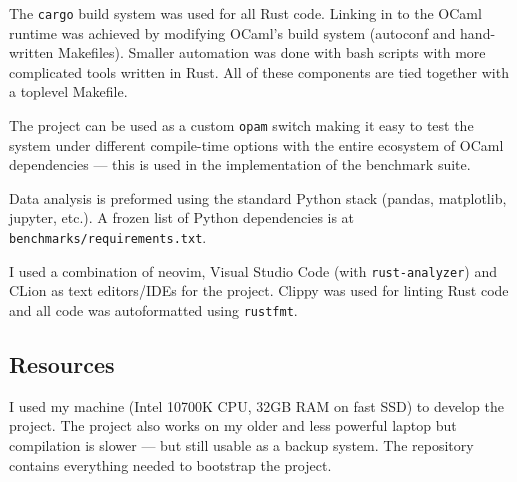 
The \texttt{cargo} build system was used for all Rust code. Linking in to the OCaml runtime was
achieved by modifying OCaml's build system (autoconf and hand-written Makefiles). Smaller
automation
was done with bash scripts with more complicated tools written in Rust.  All of these components
are tied together with a toplevel Makefile.

The project can be used as a custom \texttt{opam} switch making it easy to test the system under
different compile-time options with the entire ecosystem of OCaml dependencies --- this is used in
the implementation of the benchmark suite.

Data analysis is preformed using the standard Python stack (pandas, matplotlib, jupyter, etc.). A
frozen
list of Python dependencies is at \texttt{benchmarks/requirements.txt}.

I used a combination of neovim, Visual Studio Code (with \texttt{rust-analyzer}) and CLion as text
editors/IDEs for the project.  Clippy was used for linting Rust code and all code was autoformatted
using \texttt{rustfmt}.

\subsection{Resources}

I used my machine (Intel 10700K CPU, 32GB RAM on fast SSD) to develop the project. The project also
works on my older and less powerful laptop but compilation is slower --- but still usable as a
backup system. The repository contains everything needed to bootstrap the project.